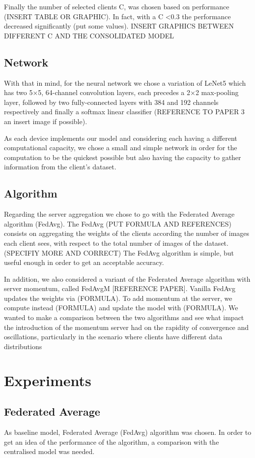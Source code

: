 \documentclass[twocolumn]{article}
\begin{document}
Finally the number of selected clients C, was chosen based on performance (INSERT TABLE OR GRAPHIC). In fact, with a C <0.3 the performance decreased significantly (put some values).
INSERT GRAPHICS BETWEEN DIFFERENT C AND THE CONSOLIDATED MODEL

\subsection{Network}

With that in mind, for the neural network we chose a variation of LeNet5 which has two 5×5, 64-channel convolution layers, each precedes a 2×2 max-pooling layer, followed by two fully-connected layers with 384 and 192 channels respectively and finally a softmax linear classifier (REFERENCE TO PAPER 3 an insert image if possible). 

As each device implements our model and considering each having a different computational capacity, we chose a small and simple network in order for the computation to be the quickest possible but also having the capacity to gather information from the client's dataset.

\subsection{Algorithm}
Regarding the server aggregation we chose to go with the Federated Average algorithm (FedAvg). The FedAvg (PUT FORMULA AND REFERENCES) consists on aggregating the weights of the clients according the number of images each client sees, with respect to the total number of images of the dataset.(SPECIFIY MORE AND CORRECT)
The FedAvg algorithm is simple, but useful enough in order to get an acceptable accuracy.

In addition, we also considered a variant of the Federated Average algorithm with server momentum, called FedAvgM [REFERENCE PAPER]. Vanilla FedAvg updates the weights via (FORMULA). To add momentum at the server, we compute instead (FORMULA) and update the model with (FORMULA). 
We wanted to make a comparison between the two algorithms and see what impact the introduction of the momentum server had on the rapidity of convergence and oscillations, particularly in the scenario where clients have different data distributions


\section{Experiments} %
\subsection{Federated Average}
As baseline model, Federated Average (FedAvg) algorithm was chosen. In order to get an idea of the performance of the algorithm, a comparison with the centralised model was needed. 
\end{document}
